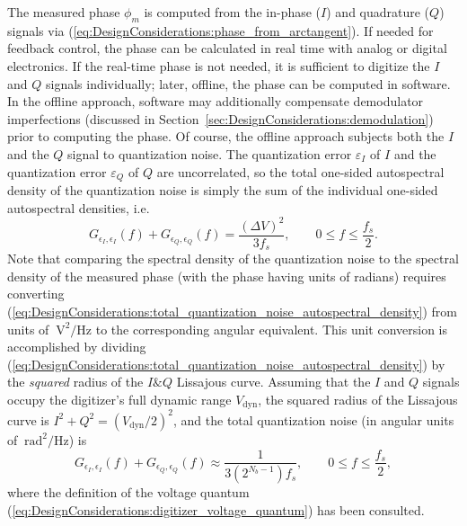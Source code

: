 The measured phase $\phi_m$ is computed from
the in-phase ($I$) and quadrature ($Q$) signals via
(\ref{eq:DesignConsiderations:phase_from_arctangent}).
If needed for feedback control,
the phase can be calculated in real time
with analog or digital electronics.
If the real-time phase is not needed,
it is sufficient to digitize the $I$ and $Q$ signals individually;
later, offline, the phase can be computed in software.
In the offline approach,
software may additionally compensate demodulator imperfections
(discussed in Section~\ref{sec:DesignConsiderations:demodulation})
prior to computing the phase.
Of course, the offline approach
subjects both the $I$ and the $Q$ signal to quantization noise.
The quantization error $\varepsilon_I$ of $I$ and
the quantization error $\varepsilon_Q$ of $Q$
are uncorrelated, so
the total one-sided autospectral density of the quantization noise is simply
the sum of the individual one-sided autospectral densities, i.e.\
\begin{equation}
  G_{\epsilon_I,\epsilon_I}(f)
  +
  G_{\epsilon_Q,\epsilon_Q}(f)
  =
  \frac{(\Delta V)^2}{3 f_s},
  \qquad
  0 \leq f \leq \frac{f_s}{2}.
  \label{eq:DesignConsiderations:total_quantization_noise_autospectral_density}
\end{equation}
Note that comparing the spectral density of the quantization noise
to the spectral density of the measured phase
(with the phase having units of radians)
requires converting
(\ref{eq:DesignConsiderations:total_quantization_noise_autospectral_density})
from units of $\SI{}{\volt\squared\per\Hz}$
to the corresponding angular equivalent.
This unit conversion is accomplished by dividing
(\ref{eq:DesignConsiderations:total_quantization_noise_autospectral_density})
by the \emph{squared} radius of the $I\&Q$ Lissajous curve.
Assuming that the $I$ and $Q$ signals occupy
the digitizer's full dynamic range $V_{\text{dyn}}$,
the squared radius of the Lissajous curve is
$I^2 + Q^2 = (V_{\text{dyn}} / 2)^2$, and
the total quantization noise
(in angular units of $\SI{}{\radian\squared\per\Hz}$) is
\begin{equation}
  G_{\epsilon_I,\epsilon_I}(f)
  +
  G_{\epsilon_Q,\epsilon_Q}(f)
  \approx
  \frac{1}{3 (2^{N_b - 1}) f_s},
  \qquad
  0 \leq f \leq \frac{f_s}{2},
  \label{eq:DesignConsiderations:total_quantization_noise_autospectral_density_angular_units}
\end{equation}
where the definition of the voltage quantum
(\ref{eq:DesignConsiderations:digitizer_voltage_quantum})
has been consulted.


